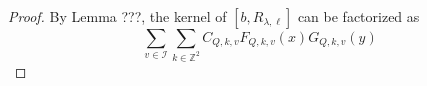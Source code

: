 \documentclass[12pt]{amsart}
\begin{document}
\begin{proof}
By Lemma ???, the kernel  of $[b,R_{\lambda,\ell}]$ can be factorized as
$$\sum_{v\in\mathcal{I}}\sum_{k\in\mathbb{Z}^2}C_{Q,k,v}F_{Q,k,v}(x)G_{Q,k,v}(y)$$
\end{proof}
%
%
\end{document}
